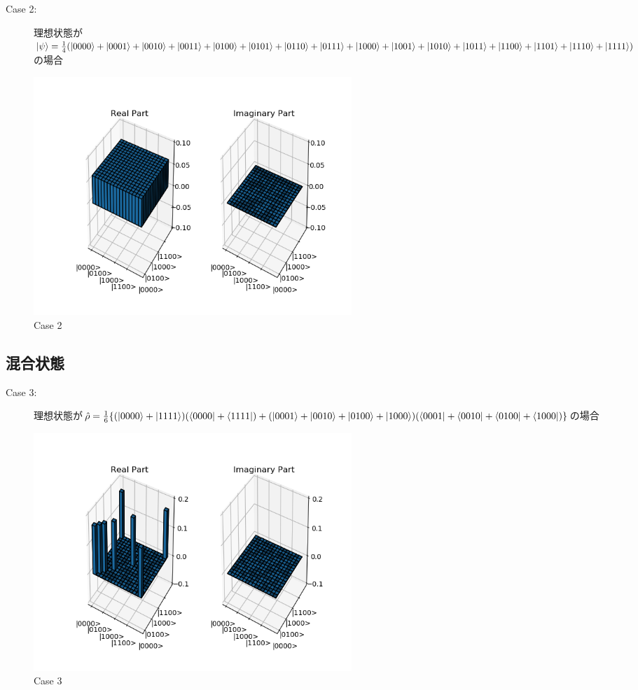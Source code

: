 \documentclass[11pt,a4j,notitlepage]{jreport}
\begin{document}
	\newpage

	\begin{description}
		\item[Case 2:] 理想状態が$\ket{\psi} = \frac{1}{4} (\ket{0000} + \ket{0001} + \ket{0010} + \ket{0011} + \ket{0100} + \ket{0101} + \ket{0110} + \ket{0111} + \ket{1000} + \ket{1001} + \ket{1010} + \ket{1011} + \ket{1100} + \ket{1101} + \ket{1110} + \ket{1111})$の場合 
	\end{description}
	
	\begin{figure}[htbp]
		\centering
			\includegraphics[clip,width=12.0cm]{./picture/all.png}
			\caption{Case 2}
	\end{figure}

	\newpage
	\subsection*{混合状態}

	\begin{description}
		\item[Case 3:] 理想状態が$\hat{\rho} = \frac{1}{6} \{ (\ket{0000} + \ket{1111}) (\bra{0000} + \bra{1111}) + (\ket{0001} + \ket{0010} + \ket{0100} + \ket{1000}) (\bra{0001} + \bra{0010} + \bra{0100} + \bra{1000})\}$の場合 
	\end{description}
	
	\begin{figure}[htbp]
		\centering
			\includegraphics[clip,width=12.0cm]{./picture/mixed.png}
			\caption{Case 3}
	\end{figure}
\end{document}
